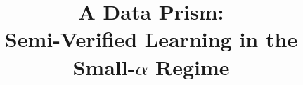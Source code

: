 \documentclass[anon,12pt]{colt2018}
\title[A Data Prism]{A Data Prism:\\ Semi-Verified Learning in the Small-$\alpha$ Regime}
\newcommand{\eps}{\epsilon}
\begin{document}
\maketitle








\begin{abstract}
\begin{comment}
We consider a simple model of unreliable or crowdsourced data where there is an underlying set of $n$ binary variables, each ``evaluator'' contributes a (possibly unreliable or adversarial) estimate of the values of some subset of $r$ of the variables, and the learner is given the true value of a \emph{constant} number of variables.   We show that, provided an $\alpha$-fraction of the evaluators are ``good'' (either correct, or with independent noise rate $p < 1/2$), then the true values of a $(1-\eps)$ fraction of the $n$ underlying variables can be deduced as long as $\alpha > 1/(2-2p)^r$.   For example, if each ``good'' worker evaluates a random set of $10$ items and there is no noise in their responses, then accurate recovery is possible provided  the fraction of good evaluators is larger than $1/1024$.  This result is optimal in that if $\alpha \le 1/(2-2p)^r,$ the large dataset can contain no information.   This setting can be viewed as an instance of the  \emph{semi-verified} learning model introduced in~\cite{CSV17}, which explores the tradeoff between the number of items evaluated by each worker and the fraction of ``good'' evaluators.  Our results require the number of evaluators to be extremely large, $ >n^r$, although our algorithm runs in \emph{linear} time, $O_{r,\eps}(n)$, given query access to the large dataset of evaluations.  This setting and results can also be viewed as examining a general class of semi-adversarial CSPs with a planted assignment.

This extreme parameter regime, where the fraction of reliable data is small (inverse exponential in the amount of data provided by each source), is relevant to a number of practical settings.  For example, settings where one has a large dataset of customer preferences, with each customer specifying preferences for a small (constant) number of items, and the goal is to ascertain the preferences of a specific demographic of interest.   Our results show that this large dataset (which lacks demographic information) can be leveraged together with the preferences of the demographic of interest for a \emph{constant} number of randomly selected items, to recover an accurate estimate of the entire set of preferences, even if the  fraction of the original dataset contributed by the demographic of interest is inverse exponential in the number of preferences supplied by each customer.   In this sense, our results can be viewed as a ``data prism'' allowing one to extract the behavior of specific cohorts from a large, mixed, dataset.
\end{comment}


\end{abstract}
\end{document}
